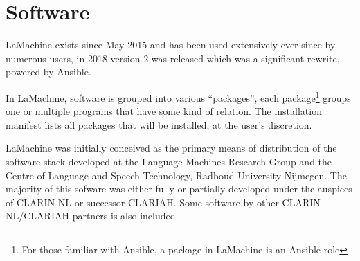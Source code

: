 \documentclass[a4paper,11pt]{article}
\begin{document}
\section{Software}

LaMachine exists since May 2015 and has been used extensively ever since by numerous users, in 2018 version 2 was
released which was a significant rewrite, powered by Ansible.

In LaMachine, software is grouped into various ``packages'', each package\footnote{For those familiar with
Ansible, a package in LaMachine is an Ansible role} groups one or multiple programs that have some kind of relation. The
installation manifest lists all packages that will be installed, at the user's discretion.

LaMachine was initially conceived as the primary means of distribution of the software stack developed at the Language
Machines Research Group and the Centre of
Language and Speech Technology, Radboud University Nijmegen. The majority of this sofware was either fully or partially developed under the auspices of CLARIN-NL or successor
CLARIAH. Some software by other CLARIN-NL/CLARIAH partners is also included.
\end{document}
